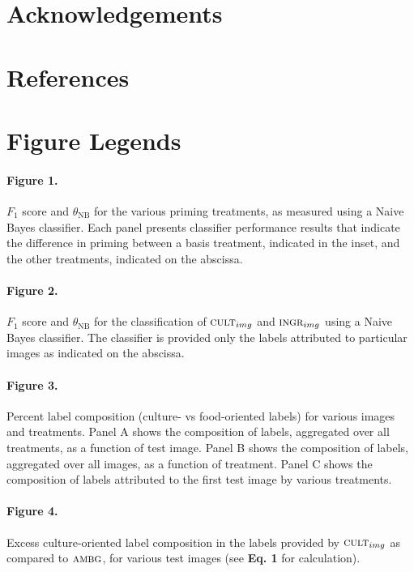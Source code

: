 \documentclass[a4paper]{report}
\begin{document}
\section*{Acknowledgements}
\section*{References}

\section*{Figure Legends}
\paragraph{Figure 1.}
$F_1$ score and $\theta_\text{NB}$ for the various 
priming treatments, as measured using a Naive Bayes classifier. Each panel 
presents classifier performance results that indicate the difference in
priming between a basis 
treatment, indicated in the inset, and the other treatments, indicated on the
abscissa.

\paragraph{Figure 2.}
$F_1$ score and $\theta_\text{NB}$ for the classification of 
$\textsc{cult}_{img}$ and $\textsc{ingr}_{img}$ using a Naive Bayes 
classifier.  The classifier is provided only the labels attributed to
particular images as indicated on the abscissa.

\paragraph{Figure 3.}
Percent label composition (culture- vs food-oriented labels) for 
various images and treatments.  Panel A shows the composition of 
labels, aggregated over all treatments, as a function of test image.
Panel B shows the composition of labels, aggregated over all images, as
a function of treatment.  Panel C shows the composition of labels 
attributed to the first test image by various treatments.

\paragraph{Figure 4.}
Excess culture-oriented label composition in the labels provided
by $\textsc{cult}_{img}$ as compared to $\textsc{ambg}$, for various
test images (see \textbf{Eq. 1} for calculation).
\end{document}
